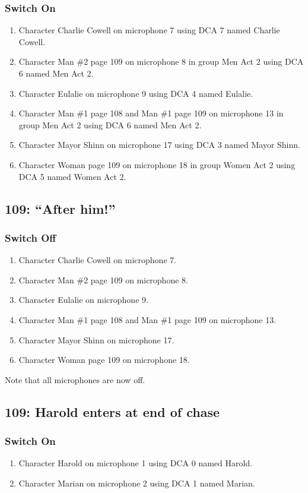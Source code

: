 \subsubsection* {Switch On}
\begin{enumerate}
\item Character Charlie Cowell on microphone 7 using DCA 7 named Charlie Cowell.
\item Character Man \#2 page 109 on microphone 8 in group Men Act 2 using DCA 6 named Men Act 2.
\item Character Eulalie on microphone 9 using DCA 4 named Eulalie.
\item Character Man \#1 page 108 and Man \#1 page 109 on microphone 13 in group Men Act 2 using DCA 6 named Men Act 2.
\item Character Mayor Shinn on microphone 17 using DCA 3 named Mayor Shinn.
\item Character Woman page 109 on microphone 18 in group Women Act 2 using DCA 5 named Women Act 2.
\end{enumerate}
\subsection* {109: ``After him!''}
\subsubsection* {Switch Off}
\begin{enumerate}
\item Character Charlie Cowell on microphone 7.
\item Character Man \#2 page 109 on microphone 8.
\item Character Eulalie on microphone 9.
\item Character Man \#1 page 108 and Man \#1 page 109 on microphone 13.
\item Character Mayor Shinn on microphone 17.
\item Character Woman page 109 on microphone 18.
\end{enumerate}
Note that all microphones are now off.
\subsection* {109: Harold enters at end of chase}
\subsubsection* {Switch On}
\begin{enumerate}
\item Character Harold on microphone 1 using DCA 0 named Harold.
\item Character Marian on microphone 2 using DCA 1 named Marian.
\end{enumerate}
